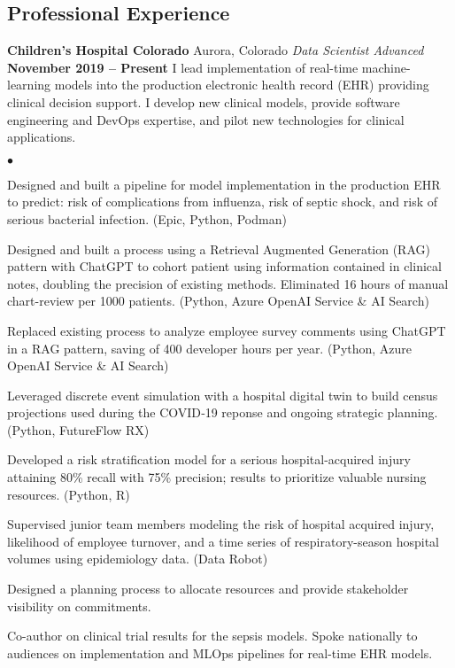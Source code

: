 \documentclass[margin,line, 11pt]{res}
\newenvironment{list2}{
  \begin{list}{$\bullet$}{%
      \setlength{\itemsep}{0in}
      \setlength{\parsep}{0in} \setlength{\parskip}{0in}
      \setlength{\topsep}{0in} \setlength{\partopsep}{0in}
      \setlength{\leftmargin}{0.2in}}}{\end{list}}
\begin{document}
\begin{resume}
\section{Professional \newline Experience}
\textbf{Children's Hospital Colorado} \hfill Aurora, Colorado\newline
\textit{Data Scientist Advanced} \hfill \textbf{November 2019 -- Present}\newline
I lead implementation of real-time machine-learning models into the production electronic health record (EHR) providing clinical decision support. I develop new clinical models, provide software engineering and DevOps expertise, and pilot new technologies for clinical applications.
    \begin{list2}
      \item Designed and built a pipeline for model implementation in the production EHR to predict: risk of complications from influenza, risk of septic shock, and risk of serious bacterial infection. (Epic, Python, Podman)
      \item Designed and built a process using a Retrieval Augmented Generation (RAG) pattern with ChatGPT to cohort patient using information contained in clinical notes, doubling the precision of existing methods. Eliminated 16 hours of manual chart-review per 1000 patients. (Python, Azure OpenAI Service \& AI Search)
      \item Replaced existing process to analyze employee survey comments using ChatGPT in a RAG pattern, saving of 400 developer hours per year. (Python, Azure OpenAI Service \& AI Search)
      \item Leveraged discrete event simulation with a hospital digital twin to build census projections used during the COVID‑19 reponse and ongoing strategic planning. (Python, FutureFlow RX)
      \item Developed a risk stratification model for a serious hospital-acquired injury attaining 80\% recall with 75\% precision; results to prioritize valuable nursing resources. (Python, R)
      \item Supervised junior team members modeling the risk of hospital acquired injury, likelihood of employee turnover, and a time series of respiratory-season hospital volumes using epidemiology data. (Data Robot)
      \item Designed a planning process to allocate resources and provide stakeholder visibility on commitments.
      \item Co-author on clinical trial results for the sepsis models. Spoke nationally to audiences on implementation and MLOps pipelines for real-time EHR models.
    \end{list2}
\vspace*{-2mm}


\end{resume}
\end{document}
